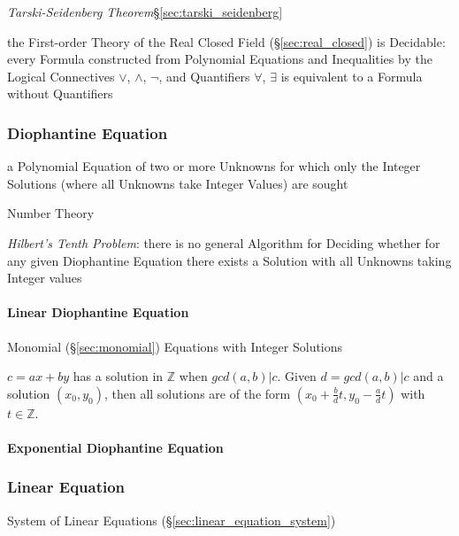 \emph{Tarski-Seidenberg Theorem}\S\ref{sec:tarski_seidenberg}

the First-order Theory of the Real Closed Field (\S\ref{sec:real_closed}) is
Decidable: every Formula constructed from Polynomial Equations and Inequalities
by the Logical Connectives $\vee$, $\wedge$, $\neg$, and Quantifiers $\forall$,
$\exists$ is equivalent to a Formula without Quantifiers



\subsubsection{Diophantine Equation}\label{sec:diophantine_equation}

a Polynomial Equation of two or more Unknowns for which only the Integer
Solutions (where all Unknowns take Integer Values) are sought

\fist Number Theory

\emph{Hilbert's Tenth Problem}: there is no general Algorithm for Deciding
whether for any given Diophantine Equation there exists a Solution with all
Unknowns taking Integer values



\paragraph{Linear Diophantine Equation}
\label{sec:linear_diophantine}\hfill

Monomial (\S\ref{sec:monomial}) Equations with Integer Solutions

$c = ax + by$ has a solution in $\mathbb{Z}$ when $gcd(a,b)|c$. Given
$d=gcd(a,b)|c$ and a solution $(x_0, y_0)$, then all solutions are of
the form $(x_0 + \frac{b}{d}t, y_0 - \frac{a}{d}t)$ with $t \in
\mathbb{Z}$.



\paragraph{Exponential Diophantine Equation}\hfill
\label{sec:exponential_diophantine}



\subsubsection{Linear Equation}\label{sec:linear_equation}

System of Linear Equations (\S\ref{sec:linear_equation_system})



